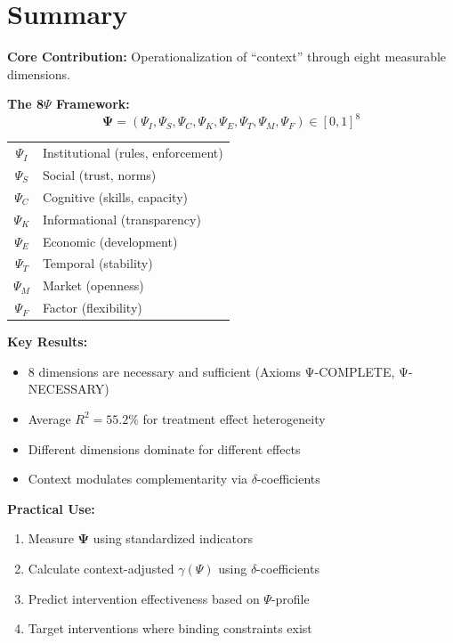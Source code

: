 \section{Summary}
\label{sec:V-summary}

\begin{tcolorbox}[colback=green!10!white, colframe=green!75!black, 
    title=\textbf{Appendix V: Complete Summary}]

\textbf{Core Contribution:} 
Operationalization of ``context'' through eight measurable dimensions.

\textbf{The 8$\Psi$ Framework:}
\[
\boldsymbol{\Psi} = (\Psi_I, \Psi_S, \Psi_C, \Psi_K, \Psi_E, \Psi_T, \Psi_M, \Psi_F) \in [0,1]^8
\]

\begin{center}
\small
\begin{tabular}{@{}cl@{}}
$\Psi_I$ & Institutional (rules, enforcement) \\
$\Psi_S$ & Social (trust, norms) \\
$\Psi_C$ & Cognitive (skills, capacity) \\
$\Psi_K$ & Informational (transparency) \\
$\Psi_E$ & Economic (development) \\
$\Psi_T$ & Temporal (stability) \\
$\Psi_M$ & Market (openness) \\
$\Psi_F$ & Factor (flexibility) \\
\end{tabular}
\end{center}

\textbf{Key Results:}
\begin{itemize}[nosep]
    \item 8 dimensions are necessary and sufficient (Axioms Ψ-COMPLETE, Ψ-NECESSARY)
    \item Average $R^2 = 55.2\%$ for treatment effect heterogeneity
    \item Different dimensions dominate for different effects
    \item Context modulates complementarity via $\delta$-coefficients
\end{itemize}

\textbf{Practical Use:}
\begin{enumerate}[nosep]
    \item Measure $\boldsymbol{\Psi}$ using standardized indicators
    \item Calculate context-adjusted $\gamma(\Psi)$ using $\delta$-coefficients
    \item Predict intervention effectiveness based on $\Psi$-profile
    \item Target interventions where binding constraints exist
\end{enumerate}

\end{tcolorbox}

